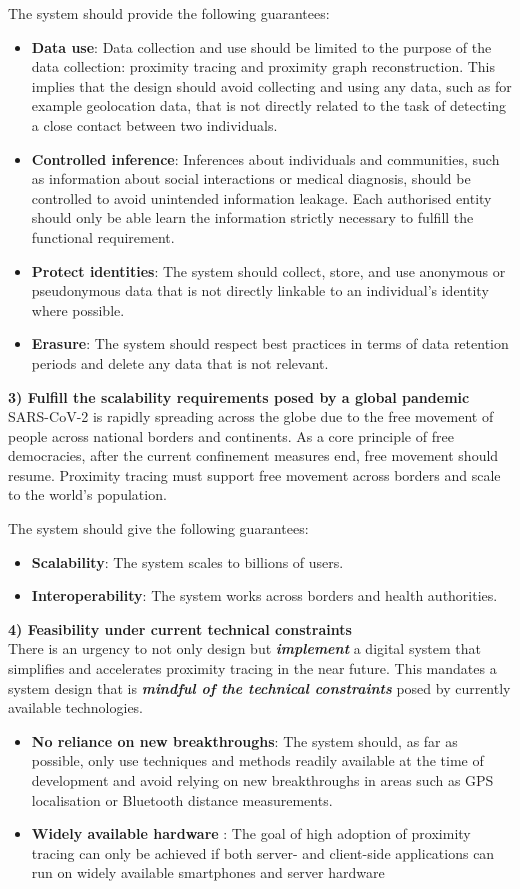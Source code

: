 \documentclass[12pt,a4paper]{article}
\begin{document}
The system should provide the following guarantees:
\begin{itemize}\itemsep0pt
\item \textbf{Data use}: Data collection and use should be limited to the purpose of the data collection: proximity tracing and proximity graph reconstruction. This implies that the design should avoid collecting and using any data, such as for example geolocation
data, that is not directly related to the task of detecting a close contact between two
individuals.
\item \textbf{Controlled inference}: Inferences about individuals and communities, such as
information about social interactions or medical diagnosis, should be controlled to
avoid unintended information leakage. Each authorised entity should only be able
learn the information strictly necessary to fulfill the functional requirement.
\item \textbf{Protect identities}: The system should collect, store, and use anonymous or
pseudonymous data that is not directly linkable to an individual’s identity where
possible.
\item \textbf{Erasure}: The system should respect best practices in terms of data retention periods and delete any data that is not relevant.
\end{itemize}
\textbf{3) Fulfill the scalability requirements posed by a global pandemic}\\
SARS-CoV-2 is rapidly spreading across the globe due to the free movement of people
across national borders and continents. As a core principle of free democracies, after the
current confinement measures end, free movement should resume. Proximity tracing must
support free movement across borders and scale to the world’s population.

The system should give the following guarantees:
\begin{itemize}\itemsep0pt
\item \textbf{Scalability}:  The system scales to billions of users.
\item \textbf{Interoperability}:  The system works across borders and health authorities.
\end{itemize}
\textbf{4) Feasibility under current technical constraints}\\
There is an urgency to not only design but \textbf{\textit{implement}} a digital system that simplifies and accelerates proximity tracing in the near future. This mandates a system design that is \textbf{\textit{mindful of the technical constraints}}  posed by currently available technologies.
\begin{itemize}\itemsep0pt
\item \textbf{No reliance on new breakthroughs}: The system should, as far as possible, only
use techniques and methods readily available at the time of development and avoid
relying on new breakthroughs in areas such as GPS localisation or Bluetooth
distance measurements.
\item \textbf{Widely available hardware} : The goal of high adoption of proximity tracing can only
be achieved if both server- and client-side applications can run on widely available
smartphones and server hardware
\end{itemize}
\clearpage
\end{document}
